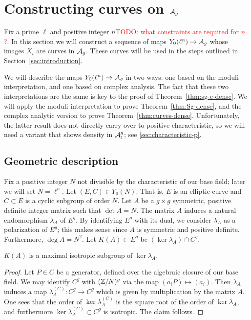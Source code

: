 \documentclass{amsart}
\begin{document}
\section{Constructing curves on $\mathcal{A}_g$}
\label{sec:curves-on-Ag}

Fix a prime $\ell$ and positive integer $n$\textcolor{red}{TODO: what constraints are required for $n$?}. In this section we will construct a sequence of maps $Y_0(\ell^n) \to \mathcal{A}_g$ whose images $X_i$ are curves in $\mathcal{A}_g$. These curves will be used in the steps outlined in Section~\ref{sec:introduction}.

We will describe the maps $Y_0(\ell^n) \to \mathcal{A}_g$ in two ways: one based on the moduli interpretation, and one based on complex analysis. The fact that these two interpretations are the same is key to the proof of Theorem~\ref{thm:sg-c-dense}. We will apply the moduli interpretation to prove Theorem~\ref{thm:Sg-dense}, and the complex analytic version to prove Theorem~\ref{thm:curves-dense}. Unfortunately, the latter result does not directly carry over to positive characteristic, so we will need a variant that shows density in $\mathcal{A}_1^g$; see \ref{sec:characteristic-p}.

\subsection{Geometric description}
\label{sec:geo-desc}

Fix a positive integer $N$ not divisible by the characteristic of our base field; later we will set $N = \ell^n$. Let $(E, C) \in Y_0(N)$. That is, $E$ is an elliptic curve and $C \subset E$ is a cyclic subgroup of order $N$. Let $A$ be a $g \times g$ symmetric, positive definite integer matrix such that $\det A = N$. The matrix $A$ induces a natural endomorphism $\lambda_A$ of $E^g$. By identifying $E^g$ with its dual, we consider $\lambda_A$ as a polarization of $E^g$; this makes sense since $A$ is symmetric and positive definite. Furthermore, $\deg A = N^2$. Let $K(A) \subset E^g$ be $(\ker \lambda_A) \cap C^g$.

\begin{lemma}
  $K(A)$ is a maximal isotropic subgroup of $\ker \lambda_A$.
\end{lemma}

\begin{proof}
  Let $P \in C$ be a generator, defined over the algebraic closure of our base field. We may identify $C^g$ with $(\mathbb{Z}/N)^g$ via the map $(a_iP) \mapsto (a_i)$. Then $\lambda_A$ induces a map $\lambda_A^{(C)}:C^g \to C^g$ which is given by multiplication by the matrix $A$. One sees that the order of $\ker \lambda_A^{(C)}$ is the square root of the order of $\ker \lambda_A$, and furthermore $\ker \lambda_A^{(C)} \subset C^g$ is isotropic. The claim follows.
\end{proof}
\end{document}
